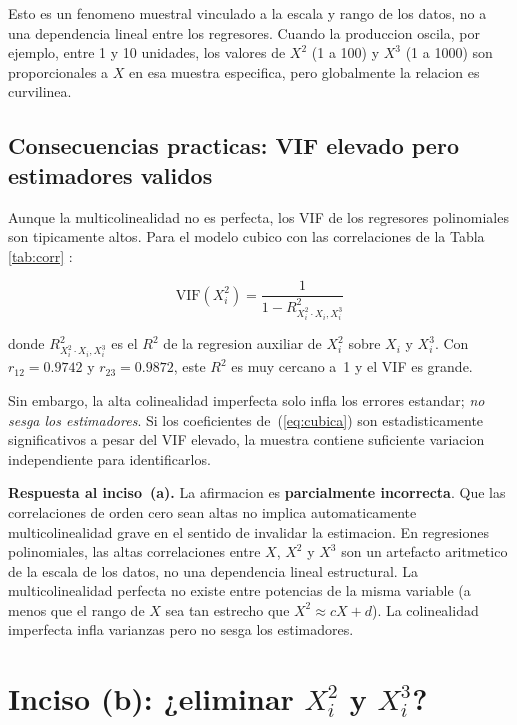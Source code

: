 \documentclass[12pt, letterpaper]{article}
\theoremstyle{remark}
\begin{document}
Esto es un fenomeno muestral vinculado a la escala y rango de los datos, no
a una dependencia lineal entre los regresores. Cuando la produccion oscila,
por ejemplo, entre 1 y 10 unidades, los valores de $X^2$ (1 a 100) y $X^3$
(1 a 1000) son proporcionales a $X$ en esa muestra especifica, pero
globalmente la relacion es curvilinea.

\subsection{Consecuencias practicas: VIF elevado pero estimadores validos}

Aunque la multicolinealidad no es perfecta, los VIF de los regresores
polinomiales son tipicamente altos. Para el modelo cubico con las
correlaciones de la Tabla~ \ref{tab:corr} :

\begin{equation}
  \text{VIF}(X_i^2) = \frac{1}{1 - R_{X_i^2 \cdot X_i, X_i^3}^2}
  \label{eq:VIF_X2}
\end{equation}

\noindent donde $R_{X_i^2 \cdot X_i, X_i^3}^2$ es el $R^2$ de la regresion
auxiliar de $X_i^2$ sobre $X_i$ y $X_i^3$. Con $r_{12} = 0.9742$ y
$r_{23} = 0.9872$, este $R^2$ es muy cercano a~1 y el VIF es grande.

Sin embargo, la alta colinealidad imperfecta solo infla los errores estandar;
\emph{no sesga los estimadores}. Si los coeficientes de~(\ref{eq:cubica}) son
estadisticamente significativos a pesar del VIF elevado, la muestra contiene
suficiente variacion independiente para identificarlos.

\begin{clave}
  \textbf{Respuesta al inciso~(a).} La afirmacion es \textbf{parcialmente
  incorrecta}. Que las correlaciones de orden cero sean altas no implica
  automaticamente multicolinealidad grave en el sentido de invalidar la
  estimacion. En regresiones polinomiales, las altas correlaciones entre
  $X$, $X^2$ y $X^3$ son un artefacto aritmetico de la escala de los
  datos, no una dependencia lineal estructural. La multicolinealidad
  perfecta no existe entre potencias de la misma variable (a menos que el
  rango de $X$ sea tan estrecho que $X^2 \approx cX + d$). La colinealidad
  imperfecta infla varianzas pero no sesga los estimadores.
\end{clave}

\section{Inciso (b): ¿eliminar \texorpdfstring{$X_i^2$}{Xi2} y \texorpdfstring{$X_i^3$}{Xi3}?}
\end{document}
